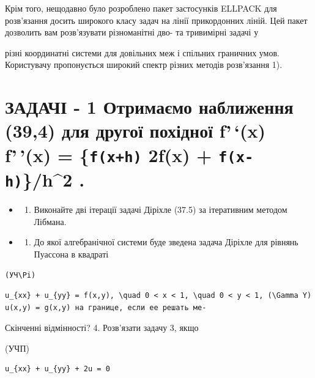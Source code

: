\documentclass[
  ukrainian,
]{article}
\providecommand{\tightlist}{%
  \setlength{\itemsep}{0pt}\setlength{\parskip}{0pt}}
\begin{document}
Крім того, нещодавно було розроблено пакет застосунків ELLPACK для
розв'язання досить широкого класу задач на лінії прикордонних ліній. Цей
пакет дозволить вам розв'язувати різноманітні дво- та тривимірні задачі
у

різні координатні системи для довільних меж і спільних граничних умов.
Користувачу пропонується широкий спектр різних методів розв'язання 1).

\section{\texorpdfstring{ЗАДАЧІ - 1 Отримаємо наближення (39,4) для
другої похідної f'\,`(x) f'\,'(x) = \{\texttt{f(x+h)} 2f(x) +
\texttt{f(x-h)}\}/h\^{}2
.}{ЗАДАЧІ - 1 Отримаємо наближення (39,4) для другої похідної f'\,`(x) f'\,'(x) = \{f(x+h) 2f(x) + f(x-h)\}/h\^{}2 .}}\label{ux437ux430ux434ux430ux447ux456---1-ux43eux442ux440ux438ux43cux430ux454ux43cux43e-ux43dux430ux431ux43bux438ux436ux435ux43dux43dux44f-394-ux434ux43bux44f-ux434ux440ux443ux433ux43eux457-ux43fux43eux445ux456ux434ux43dux43eux457-fx-fx-fxh-2fx-fx-hh2-.}

\begin{itemize}
\tightlist
\item
  \begin{enumerate}
  \def\labelenumi{\arabic{enumi}.}
  \setcounter{enumi}{1}
  \tightlist
  \item
    Виконайте дві ітерації задачі Діріхле (37.5) за ітеративним методом
    Лібмана.
  \end{enumerate}
\item
  \begin{enumerate}
  \def\labelenumi{\arabic{enumi}.}
  \setcounter{enumi}{2}
  \tightlist
  \item
    До якої алгебранічної системи буде зведена задача Діріхле для
    рівнянь Пуассона в квадраті
  \end{enumerate}
\end{itemize}

\texttt{(УЧ\textbackslash{}Pi)}

\begin{verbatim}
u_{xx} + u_{yy} = f(x,y), \quad 0 < x < 1, \quad 0 < y < 1, (\Gamma Y) u(x,y) = g(x,y) на границе, если ее решать ме-
\end{verbatim}

Скінченні відмінності? 4. Розв'язати задачу 3, якщо

(УЧП)

\begin{verbatim}
u_{xx} + u_{yy} + 2u = 0
\end{verbatim}
\end{document}
